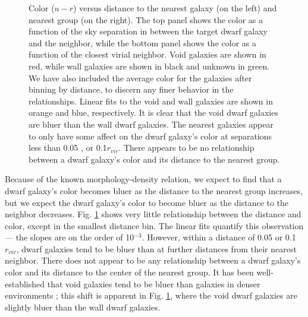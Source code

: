 \begin{figure}
    \caption[$u-r$ versus distance to nearest neighbor and group]{Color ($u-r$) 
    versus distance to the nearest galaxy (on the left) and nearest group (on 
    the right).  The top panel shows the color as a function of the sky 
    separation in \hMpc between the target dwarf galaxy and the neighbor, while 
    the bottom panel shows the color as a function of the closest virial 
    neighbor.  Void galaxies are shown in red, while wall galaxies are shown in 
    black and unknown in green.  We have also included the average color for the 
    galaxies after binning by distance, to discern any finer behavior in the 
    relationships.  Linear fits to the void and wall galaxies are shown in 
    orange and blue, respectively.  It is clear that the void dwarf galaxies are 
    bluer than the wall dwarf galaxies.  The nearest galaxies appear to only 
    have some affect on the dwarf galaxy's color at separations less than 0.05 
    \hMpc, or 0.1$r_{vir}$.  %
    There appears to be no relationship between a dwarf galaxy's color and its 
    distance to the nearest group.}
    \label{fig:ur}
\end{figure}

Because of the known morphology-density relation, we expect to find that a dwarf 
galaxy's color becomes bluer as the distance to the nearest group increases, but 
we expect the dwarf galaxy's color to become bluer as the distance to the 
neighbor decreases.  Fig. \ref{fig:ur} shows very little relationship between 
the distance and color, except in the smallest distance bin.  The linear fits 
quantify this observation --- the slopes are on the order of 10$^{-3}$.  
However, within a distance of 0.05 \hMpc or 0.1$r_{vir}$, dwarf galaxies tend 
to be bluer than at further distances from their nearest neighbor.  %
There does not appear to be any relationship between a dwarf galaxy's color and 
its distance to the center of the nearest group.  
It has been well-established that 
void galaxies tend to be bluer than galaxies in denser environments 
\citep{Grogin99,Rojas04,Patiri06,vonBendaBeckmann08,Hoyle12}; this shift is 
apparent in Fig. \ref{fig:ur}, where the void dwarf galaxies are slightly bluer 
than the wall dwarf galaxies.  


